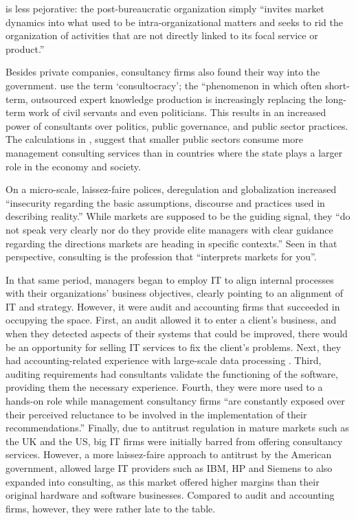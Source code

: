 \documentclass[12pt]{article}
\begin{document}
\citet[3]{furusten2000} is less pejorative: the post-bureaucratic
organization simply ``invites market dynamics into what used to be
intra-organizational matters and seeks to rid the organization of
activities that are not directly linked to its focal service or
product.''

Besides private companies, consultancy firms also found their way into
the government. \citet[242]{ylonen2019} use the term `consultocracy';
the ``phenomenon in which often short-term, outsourced expert knowledge
production is increasingly replacing the long-term work of civil
servants and even politicians. This results in an increased power of
consultants over politics, public governance, and public sector
practices. The calculations in \citet{saintmartin2017}, suggest that
smaller public sectors consume more management consulting services than
in countries where the state plays a larger role in the economy and
society.

On a micro-scale, laissez-faire polices, deregulation and globalization
increased ``insecurity regarding the basic assumptions, discourse and
practices used in describing reality.'' \citep[ 370]{pollner1991} While
markets are supposed to be the guiding signal, they ``do not speak very
clearly nor do they provide elite managers with clear guidance regarding
the directions markets are heading in specific contexts.'' Seen in that
perspective, consulting is the profession that ``interprets markets for
you''. \citep[ 37]{leicht2006}

In that same period, managers began to employ IT to align internal
processes with their organizations' business objectives, clearly
pointing to an alignment of IT and strategy. However, it were audit and
accounting firms that succeeded in occupying the space. First, an audit
allowed it to enter a client's business, and when they detected aspects
of their systems that could be improved, there would be an opportunity
for selling IT services to fix the client's problems. \citep[
73]{mazzucato2023} Next, they had accounting-related experience with
large-scale data processing \citep[ 121]{armbruster2006}. Third,
auditing requirements had consultants validate the functioning of the
software, providing them the necessary experience. Fourth, they were
more used to a hands-on role while management consultancy firms ``are
constantly exposed over their perceived reluctance to be involved in the
implementation of their recommendations.'' \citep[ 168]{czerniawska1999}
Finally, due to antitrust regulation in mature markets such as the UK
and the US, big IT firms were initially barred from offering consultancy
services. However, a more laissez-faire approach to antitrust by the
American government, allowed large IT providers such as IBM, HP and
Siemens to also expanded into consulting, as this market offered higher
margins than their original hardware and software businesses. Compared
to audit and accounting firms, however, they were rather late to the
table.
\end{document}
